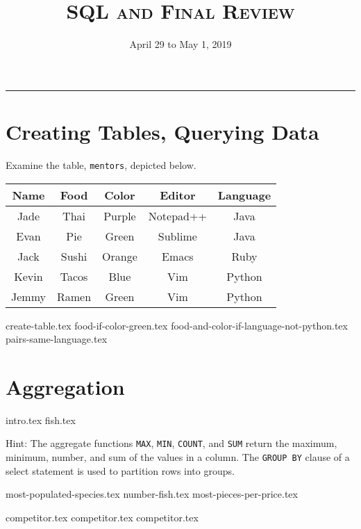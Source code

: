 \documentclass{exam}
\title{\textsc{SQL and Final Review}}
\date{April 29 to May 1, 2019}
\begin{document}
\maketitle
\rule{\textwidth}{0.15em}
\fontsize{12}{15}\selectfont

\section{Creating Tables, Querying Data}
Examine the table, \texttt{mentors}, depicted below.

\begin{center}
\begin{tabular}{|c|c|c|c|c|}
 \hline
 \textbf{Name} & \textbf{Food} & \textbf{Color} & \textbf{Editor} & \textbf{Language} \\
 \hline
 Jade & Thai & Purple & Notepad++ & Java \\
 \hline
 Evan & Pie & Green & Sublime & Java \\
 \hline
 Jack & Sushi & Orange & Emacs & Ruby \\
 \hline
 Kevin & Tacos & Blue & Vim & Python \\
 \hline
 Jemmy & Ramen & Green & Vim & Python \\
 \hline
\end{tabular}
\end{center}

\begin{questions}
{create-table.tex}
\newpage
{food-if-color-green.tex}
{food-and-color-if-language-not-python.tex}
{pairs-same-language.tex}
\end{questions}

\newpage
\section{Aggregation}
{intro.tex}
{fish.tex}

Hint: The aggregate functions \texttt{MAX}, \texttt{MIN}, \texttt{COUNT}, and \texttt{SUM} return the maximum, minimum, number, and sum of the values in a column. The  \texttt{GROUP BY} clause of a select statement is used to partition rows into groups.

\begin{questions}
{most-populated-species.tex}
{number-fish.tex}
{most-pieces-per-price.tex}

\newpage
{competitor.tex}
{competitor.tex}
{competitor.tex}
\end{questions}
\end{document}
